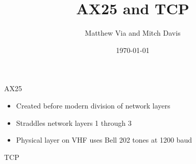 \documentclass[xcolor=dvipsnames]{beamer}
\begin{document}
\author{Matthew Via and Mitch Davis}
\title{AX25 and TCP}
\date{\today}
\begin{frame}{}
  \titlepage
\end{frame}

\begin{frame}{AX25}
  \begin{itemize}
    \item Created before modern division of network layers
    \item Straddles network layers 1 through 3
    \item Physical layer on VHF uses Bell 202 tones at 1200 baud
  \end{itemize}
\end{frame}

\begin{frame}{TCP}

\end{frame}
\end{document}
